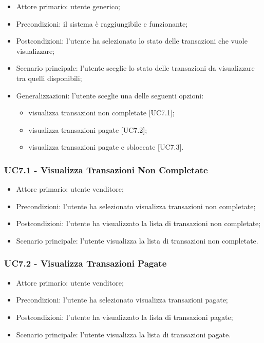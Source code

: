 \begin{itemize}
    \item Attore primario: utente generico;
    \item Precondizioni: il sistema è raggiungibile e funzionante;
    \item Postcondizioni: l'utente ha selezionato lo stato delle transazioni che vuole visualizzare;
    \item Scenario principale: l'utente sceglie lo stato delle transazioni da visualizzare tra quelli disponibili;
    \item Generalizzazioni: l'utente sceglie una delle seguenti opzioni:
    \begin{itemize}
        \item visualizza transazioni non completate [UC7.1];
        \item visualizza transazioni pagate [UC7.2];
        \item visualizza transazioni pagate e sbloccate [UC7.3].
    \end{itemize}
\end{itemize}

\subsubsection{UC7.1 - Visualizza Transazioni Non Completate}

\begin{itemize}
    \item Attore primario: utente venditore;
    \item Precondizioni: l'utente ha selezionato visualizza transazioni non completate;
    \item Postcondizioni: l'utente ha visualizzato la lista di transazioni non completate;
    \item Scenario principale: l'utente visualizza la lista di transazioni non completate.
\end{itemize}

\subsubsection{UC7.2 - Visualizza Transazioni Pagate}

\begin{itemize}
    \item Attore primario: utente venditore;
    \item Precondizioni: l'utente ha selezionato visualizza transazioni pagate;
    \item Postcondizioni: l'utente ha visualizzato la lista di transazioni pagate;
    \item Scenario principale: l'utente visualizza la lista di transazioni pagate.
\end{itemize}

